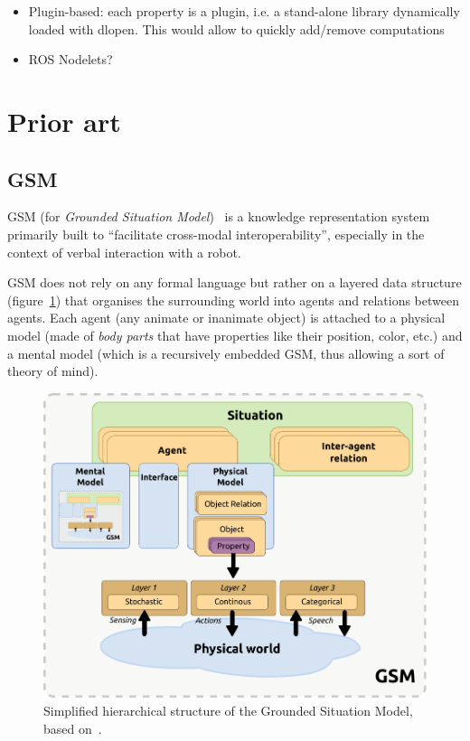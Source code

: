 \documentclass[a4paper]{article}
\begin{document}
\begin{itemize}
    \item Plugin-based: each property is a plugin, i.e. a stand-alone
        library dynamically loaded with dlopen. This would allow to
        quickly add/remove computations

    \item ROS Nodelets? 

\end{itemize}



\section{Prior art}


\subsection{GSM}
\label{sect|gsm}

GSM (for \emph{Grounded Situation Model})~\cite{Mavridis2006} is a knowledge
representation system primarily built to ``facilitate cross-modal
interoperability'',  especially in the context of verbal interaction with a
robot.

GSM does not rely on any formal language but rather on a layered data structure
(figure~\ref{fig|gsm}) that organises the surrounding world into agents and
relations between agents.  Each agent (any animate or inanimate object) is
attached to a physical model (made of \emph{body parts} that have properties
like their position, color, etc.) and a mental model (which is a recursively
embedded GSM, thus allowing a sort of theory of mind).

\begin{figure}[!h]
    \centering
    \includegraphics[width=0.65\columnwidth]{images/gsm.pdf}

    \caption{Simplified hierarchical structure of the Grounded Situation Model,
    based on~\cite{Mavridis2006}.}

    \label{fig|gsm}
\end{figure}
\end{document}
